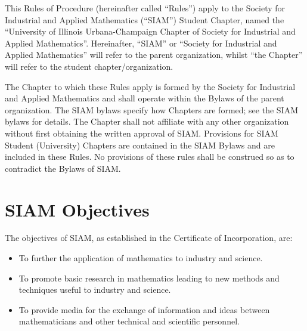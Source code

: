 \documentclass{ronr-bylaws}
\author{Nicolas Nytko}
\date{\today}
\begin{document}
\maketitlepage
\tableofcontents
\newpage
\maketitle
This Rules of Procedure (hereinafter called ``Rules'') apply to the Society for Industrial and
Applied Mathematics (``SIAM'') Student Chapter, named the ``University of Illinois Urbana-Champaign
Chapter of Society for Industrial and Applied Mathematics''.  Hereinafter, ``SIAM'' or ``Society for
Industrial and Applied Mathematics'' will refer to the parent organization, whilst ``the Chapter''
will refer to the student chapter/organization.

The Chapter to which these Rules apply is formed by the Society for Industrial and Applied
Mathematics and shall operate within the Bylaws of the parent organization. The SIAM bylaws specify
how Chapters are formed; see the SIAM bylaws for details. The Chapter shall not affiliate with any
other organization without first obtaining the written approval of SIAM. Provisions for SIAM Student
(University) Chapters are contained in the SIAM Bylaws and are included in these Rules. No
provisions of these rules shall be construed so as to contradict the Bylaws of SIAM.
\section{SIAM Objectives}
The objectives of SIAM, as established in the Certificate of Incorporation, are:
\begin{itemize}
\item To further the application of mathematics to industry and science.
\item To promote basic research in mathematics leading to new methods and techniques useful to
industry and science.
\item To provide media for the exchange of information and ideas between mathematicians and other
technical and scientific personnel.
\end{itemize}
\end{document}
